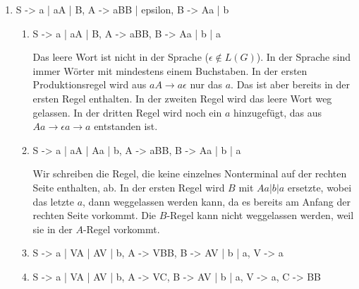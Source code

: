 \documentclass{lehramt-informatik-aufgabe}
\begin{document}
\begin{enumerate}
\item

\begin{liProduktionsRegeln}
S -> a | aA | B,
A -> aBB | epsilon,
B -> Aa | b
\end{liProduktionsRegeln}

\begin{liAntwort}
\begin{enumerate}
\item {}

\begin{liProduktionsRegeln}
S -> a | aA | B,
A -> aBB,
B -> Aa | b | a
\end{liProduktionsRegeln}

Das leere Wort ist nicht in der Sprache ($\epsilon \notin L(G )$). In
der Sprache sind immer Wörter mit mindestens einem Buchstaben. In der
ersten Produktionsregel wird aus $aA  \rightarrow a \epsilon$ nur das
$a$. Das ist aber bereits in der ersten Regel enthalten. In der zweiten
Regel wird das leere Wort weg gelassen. In der dritten Regel wird noch
ein $a$ hinzugefügt, das aus $Aa \rightarrow \epsilon a \rightarrow a$
entstanden ist.

\item {}

\begin{liProduktionsRegeln}
S -> a | aA | Aa | b,
A -> aBB,
B -> Aa | b | a
\end{liProduktionsRegeln}

Wir schreiben die Regel, die keine einzelnes Nonterminal auf der rechten
Seite enthalten, ab. In der ersten Regel wird $B$ mit $Aa | b | a$
ersetzte, wobei das letzte $a$, dann weggelassen werden kann, da es
bereits am Anfang der rechten Seite vorkommt. Die $B$-Regel kann nicht
weggelassen werden, weil sie in der $A$-Regel vorkommt.

\item {}

\begin{liProduktionsRegeln}
S -> a | VA | AV | b,
A -> VBB,
B -> AV | b | a,
V -> a
\end{liProduktionsRegeln}

\item {}

\begin{liProduktionsRegeln}
S -> a | VA | AV | b,
A -> VC,
B -> AV | b | a,
V -> a,
C -> BB
\end{liProduktionsRegeln}
\end{enumerate}
\end{liAntwort}


\end{enumerate}
\end{document}
